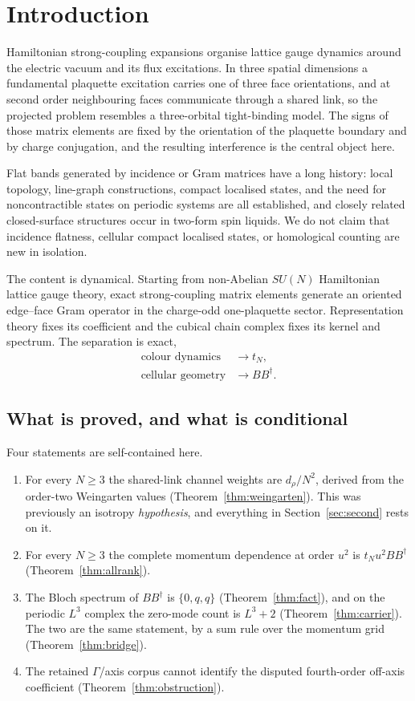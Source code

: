 \documentclass[10pt,twocolumn]{article}
\theoremstyle{plain}
\theoremstyle{definition}
\theoremstyle{remark}
\newcommand{\dg}{^{\dagger}}
\begin{document}
\section{Introduction}

Hamiltonian strong-coupling expansions organise lattice gauge dynamics around
the electric vacuum and its flux excitations. In three spatial dimensions a
fundamental plaquette excitation carries one of three face orientations, and
at second order neighbouring faces communicate through a shared link, so the
projected problem resembles a three-orbital tight-binding model. The signs of
those matrix elements are fixed by the orientation of the plaquette boundary
and by charge conjugation, and the resulting interference is the central
object here.

Flat bands generated by incidence or Gram matrices have a long history:
local topology, line-graph constructions, compact localised states, and the
need for noncontractible states on periodic systems are all established, and
closely related closed-surface structures occur in two-form spin liquids. We
do not claim that incidence flatness, cellular compact localised states, or
homological counting are new in isolation.

The content is dynamical. Starting from non-Abelian $SU(N)$ Hamiltonian
lattice gauge theory, exact strong-coupling matrix elements generate an
oriented edge--face Gram operator in the charge-odd one-plaquette sector.
Representation theory fixes its coefficient and the cubical chain complex
fixes its kernel and spectrum. The separation is exact,
\[
  \begin{aligned}
    \text{colour dynamics}&\longrightarrow t_N,\\
    \text{cellular geometry}&\longrightarrow BB\dg .
  \end{aligned}
\]

\subsection*{What is proved, and what is conditional}

Four statements are self-contained here.

\begin{enumerate}\itemsep2pt
\item For every $N\ge3$ the shared-link channel weights are $d_\rho/N^2$,
  derived from the order-two Weingarten values
  (Theorem~\ref{thm:weingarten}). This was previously an isotropy
  \emph{hypothesis}, and everything in Section~\ref{sec:second} rests on it.
\item For every $N\ge3$ the complete momentum dependence at order $u^2$ is
  $t_Nu^2BB\dg$ (Theorem~\ref{thm:allrank}).
\item The Bloch spectrum of $BB\dg$ is $\{0,q,q\}$ (Theorem~\ref{thm:fact}),
  and on the periodic $L^3$ complex the zero-mode count is $L^3+2$
  (Theorem~\ref{thm:carrier}). The two are the same statement, by a sum rule
  over the momentum grid (Theorem~\ref{thm:bridge}).
\item The retained $\Gamma$/axis corpus cannot identify the disputed
  fourth-order off-axis coefficient (Theorem~\ref{thm:obstruction}).
\end{enumerate}
\end{document}
